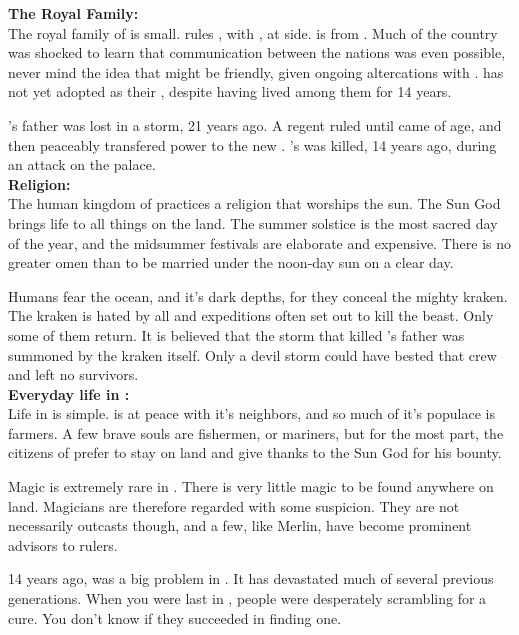 \documentclass[blue]{NeptuneBall}
\begin{document}
\name{\bHumanShort{}}

{\bf The Royal Family:}\\
The royal family of \pAmerica{} is small. \cEric{\King} \cEric{} rules \pAmerica{}, with \cEric{\their} \cAriel{\spouse}, \cAriel{\King} \cAriel{} at \cEric{\their} side. \cAriel{} is from \pAtlantis{}. Much of the country was shocked to learn that communication between the nations was even possible, never mind the idea that \pAtlantis{} might be friendly, given ongoing altercations with \pPacifica{}. \pAmerica{} has not yet adopted \cAriel{} as their \cAriel{\King}, despite \cAriel{\their} having lived among them for 14 years. 

\cEric{}'s father was lost in a storm, 21 years ago. A regent ruled until \cEric{} came of age, and then peaceably transfered power to the new \cEric{\King}. \cEric{}'s \cSlave{\sibling} was killed, 14 years ago, during an attack on the palace.\\

{\bf Religion:}\\
The human kingdom of \pAmerica{} practices a religion that worships the sun. The Sun God brings life to all things on the land. The summer solstice is the most sacred day of the year, and the midsummer festivals are elaborate and expensive. There is no greater omen than to be married under the noon-day sun on a clear day.

Humans fear the ocean, and it's dark depths, for they conceal the mighty kraken. The kraken is hated by all and expeditions often set out to kill the beast. Only some of them return. It is believed that the storm that killed \cEric{}'s father was summoned by the kraken itself. Only a devil storm could have bested that crew and left no survivors.\\

{\bf Everyday life in \pAmerica{}:}\\
Life in \pAmerica{} is simple. \pAmerica{} is at peace with it's neighbors, and so much of it's populace is farmers. A few brave souls are fishermen, or mariners,  but for the most part, the citizens of \pAmerica{} prefer to stay on land and give thanks to the Sun God for his bounty.

Magic is extremely rare in \pAmerica{}. There is very little magic to be found anywhere on land. Magicians are therefore regarded with some suspicion. They are not necessarily outcasts though, and a few, like Merlin, have become prominent advisors to rulers.

14 years ago, \cPolio{} was a big problem in \pAmerica{}. It has devastated much of several previous generations. When you were last in \pAmerica{}, people were desperately scrambling for a cure. You don't know if they succeeded in finding one.
\end{document}
